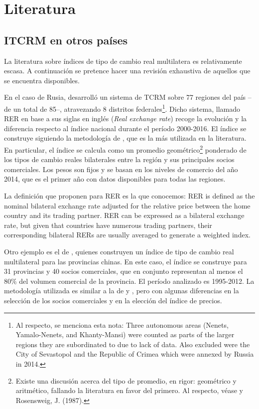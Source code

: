 \section{Literatura}\label{section2} 

\subsection{ITCRM en otros países}

La literatura sobre índices de tipo de cambio real multilatera es relativamente escasa. A continuación se pretence hacer una revisión exhaustiva de aquellos que se encuentra disponibles.

En el caso de Rusia, \cite{tochkov_2021} desarrolló un sistema de TCRM sobre 77 regiones del país –de un total de 85–, atravezando 8 distritos federales\footnote{Al respecto, se menciona esta nota: Three autonomous areas (Nenets, Yamalo-Nenets, and Khanty-Mansi) were counted as parts of the larger regions
they are subordinated to due to lack of data. Also excluded were the City of Sevastopol and the Republic of Crimea
which were annexed by Russia in 2014.}. Dicho sistema, llamado RER en base a sus siglas en inglés (\textit{Real exchange rate}) recoge la evolución y la diferencia respecto al índice nacional durante el período 2000-2016.
El índice se construye siguiendo la metodología de \cite{clark_1999}, que es la más utilizada en la literatura. En particular, el índice se calcula como un promedio geométrico\footnote{Existe una discusión acerca del tipo de promedio, en rigor: geométrico y aritmético, fallando la literatura en favor del primero. Al respecto, véase \cite{brodsky_1982} y Rosensweig, J. (1987).} ponderado de los tipos de cambio reales bilaterales entre la región y sus principales socios comerciales. Los pesos son fijos y se basan en los niveles de comercio del año 2014, que es el primer año con datos disponibles para todas las regiones.

La definición que proponen para RER es la que conocemos:
{
RER is defined as the nominal bilateral exchange rate
adjusted for the relative price between the home country and its trading partner. RER can be expressed
as a bilateral exchange rate, but given that countries have numerous trading partners, their corresponding
bilateral RERs are usually averaged to generate a weighted index.
}

Otro ejemplo es el de \cite{yan_2016}, quienes construyen un índice de tipo de cambio real multilateral para las provincias chinas. En este caso, el índice se construye para 31 provincias y 40 socios comerciales, que en conjunto representan al menos el 80\% del volumen comercial de la provincia. El período analizado es 1995-2012. La metodología utilizada es similar a la de \cite{clark_1999} y \cite{tochkov_2021}, pero con algunas diferencias en la selección de los socios comerciales y en la elección del índice de precios.

